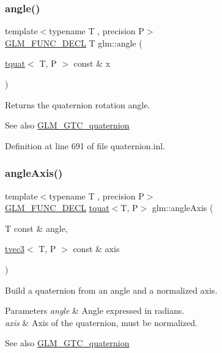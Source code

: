 \subsubsection{\texorpdfstring{angle()}{angle()}}
{\footnotesize\ttfamily template$<$typename T , precision P$>$ \\
\mbox{\hyperlink{setup_8hpp_ab2d052de21a70539923e9bcbf6e83a51}{G\+L\+M\+\_\+\+F\+U\+N\+C\+\_\+\+D\+E\+CL}} T glm\+::angle (\begin{DoxyParamCaption}\item[{\mbox{\hyperlink{structglm_1_1tquat}{tquat}}$<$ T, P $>$ const \&}]{x }\end{DoxyParamCaption})}

Returns the quaternion rotation angle.

\begin{DoxySeeAlso}{See also}
\mbox{\hyperlink{group__gtc__quaternion}{G\+L\+M\+\_\+\+G\+T\+C\+\_\+quaternion}} 
\end{DoxySeeAlso}


Definition at line 691 of file quaternion.\+inl.

\mbox{\label{group__gtc__quaternion_ga37ae19405f1ccf766f27e4fcd035d859}} 
\subsubsection{\texorpdfstring{angleAxis()}{angleAxis()}}
{\footnotesize\ttfamily template$<$typename T , precision P$>$ \\
\mbox{\hyperlink{setup_8hpp_ab2d052de21a70539923e9bcbf6e83a51}{G\+L\+M\+\_\+\+F\+U\+N\+C\+\_\+\+D\+E\+CL}} \mbox{\hyperlink{structglm_1_1tquat}{tquat}}$<$T, P$>$ glm\+::angle\+Axis (\begin{DoxyParamCaption}\item[{T const \&}]{angle,  }\item[{\mbox{\hyperlink{structglm_1_1tvec3}{tvec3}}$<$ T, P $>$ const \&}]{axis }\end{DoxyParamCaption})}

Build a quaternion from an angle and a normalized axis.


\begin{DoxyParams}{Parameters}
{\em angle} & Angle expressed in radians. \\
\hline
{\em axis} & Axis of the quaternion, must be normalized.\\
\hline
\end{DoxyParams}
\begin{DoxySeeAlso}{See also}
\mbox{\hyperlink{group__gtc__quaternion}{G\+L\+M\+\_\+\+G\+T\+C\+\_\+quaternion}} 
\end{DoxySeeAlso}


